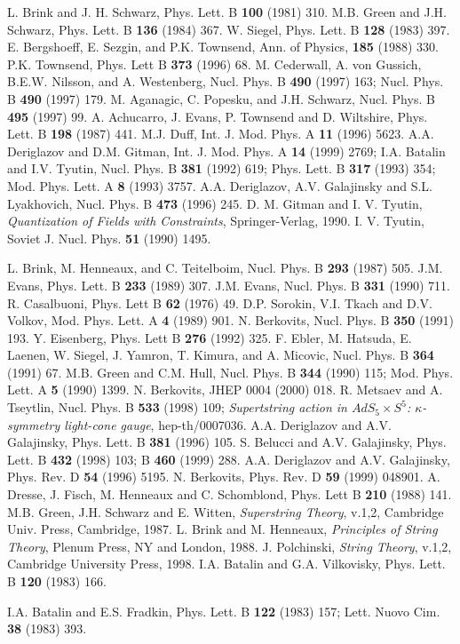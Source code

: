 \documentclass[a4paper]{article}
\begin{document}
\begin{thebibliography}{nn}
\bibitem{} L. Brink and J. H. Schwarz, Phys. Lett. B {\bf 100}
(1981) 310.
\bibitem{} M.B. Green and J.H. Schwarz, Phys. Lett. B {\bf 136}
(1984) 367.
\bibitem{} W. Siegel, Phys. Lett. B {\bf 128} (1983) 397.
\bibitem{} E. Bergshoeff, E. Sezgin, and P.K. Townsend, Ann. of Physics,
{\bf 185} (1988) 330.
\bibitem{} P.K. Townsend, Phys. Lett B {\bf 373} (1996) 68.
\bibitem{} M. Cederwall, A. von Gussich, B.E.W. Nilsson, and A.
Westenberg, Nucl. Phys. B {\bf 490} (1997) 163; Nucl. Phys. B {\bf 490}
(1997) 179.
\bibitem{} M. Aganagic, C. Popesku, and J.H. Schwarz, Nucl. Phys.
B {\bf 495} (1997) 99.
\bibitem{} A. Achucarro, J. Evans, P. Townsend and D. Wiltshire,
Phys. Lett. B {\bf 198} (1987) 441.
\bibitem{} M.J. Duff, Int. J. Mod. Phys. A {\bf 11} (1996) 5623.
\bibitem{} A.A. Deriglazov and D.M. Gitman, Int. J. Mod. Phys. A 
{\bf 14} (1999) 2769;
\bibitem{} I.A. Batalin and I.V. Tyutin, Nucl. Phys. B {\bf 381} (1992)
619; Phys. Lett. B {\bf 317} (1993) 354; Mod. Phys. Lett. A {\bf 8}
(1993) 3757.
\bibitem{} A.A. Deriglazov, A.V. Galajinsky and 
S.L. Lyakhovich, Nucl. Phys. B {\bf 473} (1996) 245. 
\bibitem{} D. M. Gitman and I. V. Tyutin, {\em Quantization of Fields
with Constraints}, Springer-Verlag, 1990.
\bibitem{} I. V. Tyutin, Soviet J. Nucl. Phys. {\bf 51} (1990) 1495. 
\item{} L. Brink, M. Henneaux, and C. Teitelboim, Nucl. Phys. B {\bf
293} (1987) 505.
\bibitem{} J.M. Evans, Phys. Lett. B {\bf 233} (1989) 307.
\bibitem{} J.M. Evans, Nucl. Phys. B {\bf 331} (1990) 711.
\bibitem{} R. Casalbuoni, Phys. Lett B {\bf 62} (1976) 49.
\bibitem{} D.P. Sorokin, V.I. Tkach and D.V. Volkov, Mod. Phys. Lett. 
A {\bf 4} (1989) 901.
\bibitem{} N. Berkovits, Nucl. Phys. B {\bf 350} (1991) 193.
 Y. Eisenberg, Phys. Lett B {\bf 276} (1992) 325.
\bibitem{} F. Ebler, M. Hatsuda, E. Laenen, W. Siegel, J. Yamron, T.
Kimura, and A. Micovic, Nucl. Phys. B {\bf 364} (1991) 67.
\bibitem{} M.B. Green and C.M. Hull, Nucl. Phys. B {\bf 344} (1990) 115;
Mod. Phys. Lett. A {\bf 5} (1990) 1399.
\bibitem{} N. Berkovits, JHEP 0004 (2000) 018.
\bibitem{} R. Metsaev and A. Tseytlin, Nucl. Phys. B {\bf 533} (1998) 
109; {\em Supertstring action in $AdS_5\times S^5$: $\kappa$-symmetry 
light-cone gauge}, hep-th/0007036.
\bibitem{} A.A. Deriglazov and A.V. Galajinsky,  
Phys. Lett. B {\bf 381} (1996) 105.
\bibitem{} S. Belucci and A.V. Galajinsky,
Phys. Lett. B {\bf 432} (1998) 103; B {\bf 460} (1999) 288.
\bibitem{} A.A. Deriglazov and A.V. Galajinsky,
Phys. Rev. D {\bf 54} (1996) 5195.
\bibitem{} N. Berkovits, Phys. Rev. D {\bf 59} (1999) 048901.
\bibitem{} A. Dresse, J. Fisch, M. Henneaux and C. Schomblond, 
Phys. Lett B {\bf 210} (1988) 141.
\bibitem{} M.B. Green, J.H. Schwarz and E. Witten,
{\it{Superstring Theory}}, v.1,2, Cambridge Univ. Press, Cambridge, 1987. 
\bibitem{} L. Brink and M. Henneaux, {\it{Principles of String Theory}},
Plenum Press, NY and London, 1988.
\bibitem{} J. Polchinski, {\it{String Theory}}, v.1,2,
Cambridge University Press, 1998.
 I.A. Batalin and G.A. Vilkovisky, Phys.  
Lett. B {\bf 120} (1983) 166.
\item{} I.A. Batalin and E.S. Fradkin, Phys. Lett. B {\bf 122} (1983) 157;
Lett. Nuovo Cim. {\bf 38} (1983) 393.
\end{thebibliography}
\end{document}
